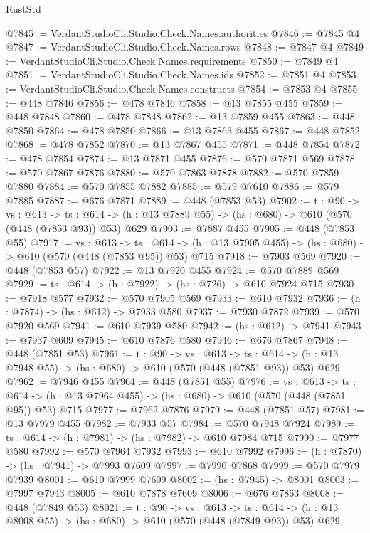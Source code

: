 \begin{lexlean}{RustStd}
\begin{coremodule}
@7845 := VerdantStudioCli.Studio.Check.Names.authorities
@7846 := @7845 @4
@7847 := VerdantStudioCli.Studio.Check.Names.rows
@7848 := @7847 @4
@7849 := VerdantStudioCli.Studio.Check.Names.requirements
@7850 := @7849 @4
@7851 := VerdantStudioCli.Studio.Check.Names.ids
@7852 := @7851 @4
@7853 := VerdantStudioCli.Studio.Check.Names.constructs
@7854 := @7853 @4
@7855 := @448 @7846
@7856 := @478 @7846
@7858 := @13 @7855 @455
@7859 := @448 @7848
@7860 := @478 @7848
@7862 := @13 @7859 @455
@7863 := @448 @7850
@7864 := @478 @7850
@7866 := @13 @7863 @455
@7867 := @448 @7852
@7868 := @478 @7852
@7870 := @13 @7867 @455
@7871 := @448 @7854
@7872 := @478 @7854
@7874 := @13 @7871 @455
@7876 := @570 @7871 @569
@7878 := @570 @7867 @7876
@7880 := @570 @7863 @7878
@7882 := @570 @7859 @7880
@7884 := @570 @7855 @7882
@7885 := @579 @7610
@7886 := @579 @7885
@7887 := @676 @7871
@7889 := @448 (@7853 @53)
@7902 := {t : @90} ->
  {vs : @613} ->
  {ts : @614} -> (h : @13 @7889 @55) -> (hs : @680) -> @610 (@570 (@448 (@7853 @93)) @53) @629
@7903 := @7887 @455
@7905 := @448 (@7853 @55)
@7917 := {vs : @613} ->
  {ts : @614} -> (h : @13 @7905 @455) -> (hs : @680) -> @610 (@570 (@448 (@7853 @95)) @53) @715
@7918 := @7903 @569
@7920 := @448 (@7853 @57)
@7922 := @13 @7920 @455
@7924 := @570 @7889 @569
@7929 := {ts : @614} -> (h : @7922) -> (hs : @726) -> @610 @7924 @715
@7930 := @7918 @577
@7932 := @570 @7905 @569
@7933 := @610 @7932
@7936 := (h : @7874) -> (hs : @612) -> @7933 @580
@7937 := @7930 @7872
@7939 := @570 @7920 @569
@7941 := @610 @7939 @580
@7942 := (hs : @612) -> @7941
@7943 := @7937 @609
@7945 := @610 @7876 @580
@7946 := @676 @7867
@7948 := @448 (@7851 @53)
@7961 := {t : @90} ->
  {vs : @613} ->
  {ts : @614} -> (h : @13 @7948 @55) -> (hs : @680) -> @610 (@570 (@448 (@7851 @93)) @53) @629
@7962 := @7946 @455
@7964 := @448 (@7851 @55)
@7976 := {vs : @613} ->
  {ts : @614} -> (h : @13 @7964 @455) -> (hs : @680) -> @610 (@570 (@448 (@7851 @95)) @53) @715
@7977 := @7962 @7876
@7979 := @448 (@7851 @57)
@7981 := @13 @7979 @455
@7982 := @7933 @57
@7984 := @570 @7948 @7924
@7989 := {ts : @614} -> (h : @7981) -> (hs : @7982) -> @610 @7984 @715
@7990 := @7977 @580
@7992 := @570 @7964 @7932
@7993 := @610 @7992
@7996 := (h : @7870) -> (hs : @7941) -> @7993 @7609
@7997 := @7990 @7868
@7999 := @570 @7979 @7939
@8001 := @610 @7999 @7609
@8002 := (hs : @7945) -> @8001
@8003 := @7997 @7943
@8005 := @610 @7878 @7609
@8006 := @676 @7863
@8008 := @448 (@7849 @53)
@8021 := {t : @90} ->
  {vs : @613} ->
  {ts : @614} -> (h : @13 @8008 @55) -> (hs : @680) -> @610 (@570 (@448 (@7849 @93)) @53) @629

\end{coremodule}
\end{lexlean}

